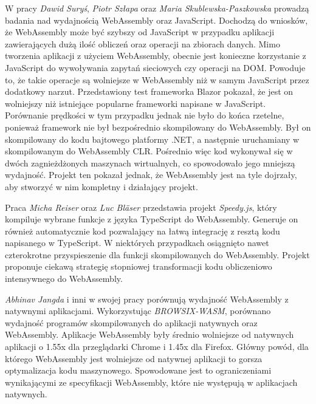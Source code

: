\documentclass[language=polish,type=master]{aghmodern}
\begin{document}
W pracy \cite{wasm_blazor} \emph{Dawid Suryś}, \emph{Piotr Szłapa} oraz \emph{Maria Skublewska-Paszkowska} prowadzą badania nad wydajnością WebAssembly oraz JavaScript.
Dochodzą do wniosków, że WebAssembly może być szybszy od JavaScript w przypadku aplikacji zawierających dużą ilość obliczeń oraz operacji na zbiorach danych.
Mimo tworzenia aplikacji z użyciem WebAssembly, obecnie jest konieczne korzystanie z JavaScript do wywoływania zapytań sieciowych czy operacji na DOM\footnotemark{}.
Powoduje to, że takie operacje są wolniejsze w WebAssembly niż w samym JavaScript przez dodatkowy narzut.
Przedstawiony test frameworka Blazor\footnotemark{} pokazał, że jest on wolniejszy niż istniejące popularne frameworki napisane w JavaScript.
Porównanie prędkości w tym przypadku jednak nie było do końca rzetelne, ponieważ framework nie był bezpośrednio skompilowany do WebAssembly.
Był on skompilowany do kodu bajtowego platformy .NET, a następnie uruchamiany w skompilowanym do WebAssembly CLR\footnotemark{}.
Pośrednio więc kod wykonywał się w dwóch zagnieżdżonych maszynach wirtualnych, co spowodowało jego mniejszą wydajność.
Projekt ten pokazał jednak, że WebAssembly jest na tyle dojrzały, aby stworzyć w nim kompletny i działający projekt.

Praca \cite{wasm_speedyjs} \emph{Micha Reiser} oraz \emph{Luc Bl\"{a}ser} przedstawia projekt \emph{Speedy.js}, który kompiluje wybrane funkcje z języka TypeScript\footnotemark{} do WebAssembly.
Generuje on również automatycznie kod pozwalający na łatwą integrację z resztą kodu napisanego w TypeScript.
W niektórych przypadkach osiągnięto nawet czterokrotne przyspieszenie dla funkcji skompilowanych do WebAssembly.
Projekt proponuje ciekawą strategię stopniowej transformacji kodu obliczeniowo intensywnego do WebAssembly.

\emph{Abhinav Jangda} i inni w swojej pracy \cite{wasm_native} porównują wydajność WebAssembly z natywnymi aplikacjami.
Wykorzystując \emph{BROWSIX-WASM}\footnotemark{}, porównano wydajność programów skompilowanych do aplikacji natywnych oraz WebAssembly.
Aplikacje WebAssembly były średnio wolniejsze od natywnych aplikacji o 1.55x dla przeglądarki Chrome i 1.45x dla Firefox.
Główny powód, dla którego WebAssembly jest wolniejsze od natywnej aplikacji to gorsza optymalizacja kodu maszynowego.
Spowodowane jest to ograniczeniami wynikającymi ze specyfikacji WebAssembly, które nie występują w aplikacjach natywnych.
\end{document}
